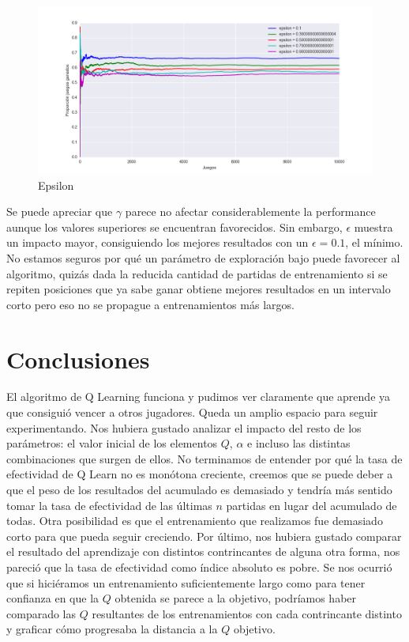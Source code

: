 \documentclass{article}
\begin{document}
\begin{figure}[H]
	\centerline{\includegraphics[width=1.3\textwidth]{figures/epsilon.png}}
	\caption{Epsilon}
\end{figure}

Se puede apreciar que $\gamma$ parece no afectar considerablemente la performance
aunque los valores superiores se encuentran favorecidos. Sin embargo, $\epsilon$
muestra un impacto mayor, consiguiendo los mejores resultados con un $\epsilon =
0.1$, el mínimo. No estamos seguros por qué un parámetro de exploración bajo
puede favorecer al algoritmo, quizás dada la reducida cantidad de partidas de
entrenamiento si se repiten posiciones que ya sabe ganar obtiene mejores
resultados en un intervalo corto pero eso no se propague a entrenamientos más largos.

\section{Conclusiones}

El algoritmo de Q Learning funciona y pudimos ver claramente que aprende ya que
consiguió vencer a otros jugadores. Queda un amplio espacio para seguir
experimentando. Nos hubiera gustado analizar el impacto del resto de los
parámetros: el valor inicial de los elementos $Q$, $\alpha$ e incluso las
distintas combinaciones que surgen de ellos. No terminamos de entender por qué
la tasa de efectividad de Q Learn no es monótona creciente, creemos que se puede
deber a que el peso de los resultados del acumulado es demasiado y tendría más
sentido tomar la tasa de efectividad de las últimas $n$ partidas en lugar del
acumulado de todas. Otra posibilidad es que el entrenamiento que realizamos fue
demasiado corto para que pueda seguir creciendo. Por último, nos hubiera gustado
comparar el resultado del aprendizaje con distintos contrincantes de alguna otra
forma, nos pareció que la tasa de efectividad como índice absoluto es pobre. Se
nos ocurrió que si hiciéramos un entrenamiento suficientemente largo como para
tener confianza en que la $Q$ obtenida se parece a la objetivo, podríamos haber
comparado las $Q$ resultantes de los entrenamientos con cada contrincante
distinto y graficar cómo progresaba la distancia a la $Q$ objetivo.
\end{document}
